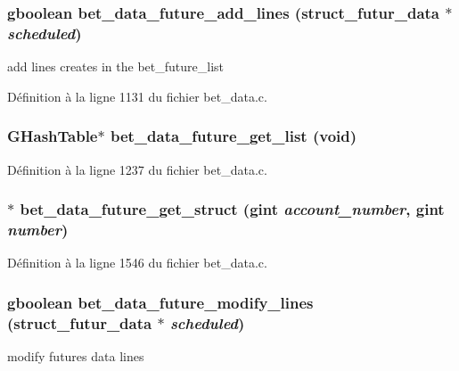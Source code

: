 \subsubsection[{bet\_\-data\_\-future\_\-add\_\-lines}]{\setlength{\rightskip}{0pt plus 5cm}gboolean bet\_\-data\_\-future\_\-add\_\-lines ({\bf struct\_\-futur\_\-data} $\ast$ {\em scheduled})}\label{bet__data_8h_a066b9bb27fff2cf3ab6220e10298ed38}
add lines creates in the bet\_\-future\_\-list 

Définition à la ligne 1131 du fichier bet\_\-data.c.

\subsubsection[{bet\_\-data\_\-future\_\-get\_\-list}]{\setlength{\rightskip}{0pt plus 5cm}GHashTable$\ast$ bet\_\-data\_\-future\_\-get\_\-list (void)}\label{bet__data_8h_a684351ebf464e4e504106b29c24ba78b}


Définition à la ligne 1237 du fichier bet\_\-data.c.

\subsubsection[{bet\_\-data\_\-future\_\-get\_\-struct}]{$\ast$ bet\_\-data\_\-future\_\-get\_\-struct (gint {\em account\_\-number}, \/  gint {\em number})}\label{bet__data_8h_aa5c30184255023ebcdf6c6234e6a989a}


Définition à la ligne 1546 du fichier bet\_\-data.c.

\subsubsection[{bet\_\-data\_\-future\_\-modify\_\-lines}]{\setlength{\rightskip}{0pt plus 5cm}gboolean bet\_\-data\_\-future\_\-modify\_\-lines ({\bf struct\_\-futur\_\-data} $\ast$ {\em scheduled})}\label{bet__data_8h_aa5807c7bbe8349ad4e5d0377d897092d}
modify futures data lines 

